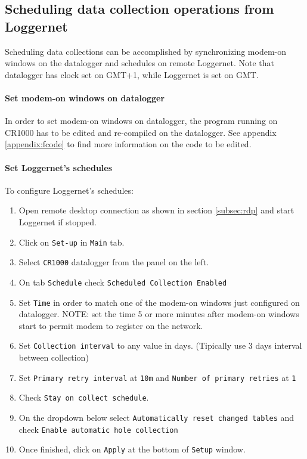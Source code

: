 \subsection{Scheduling data collection operations from Loggernet}
Scheduling data collections can be accomplished by synchronizing modem-on windows on the datalogger
and schedules on remote Loggernet. Note that datalogger has clock set on GMT+1, while Loggernet is set on
GMT.
\paragraph{Set modem-on windows on datalogger}
In order to set modem-on windows on datalogger, the program running on CR1000 has to be edited and re-compiled
on the datalogger. See appendix \ref{appendix:fcode} to find more information on the code to be edited.
\paragraph{Set Loggernet's schedules}
To configure Loggernet's schedules:
\begin{enumerate}
	\item Open remote desktop connection as shown in section \ref{subsec:rdp} and start Loggernet if stopped.
	\item Click on {\tt Set-up} in {\tt Main} tab.
	\item Select {\tt CR1000} datalogger from the panel on the left.
	\item On tab {\tt Schedule} check {\tt Scheduled Collection Enabled}
	\item Set {\tt Time} in order to match one of the modem-on windows just configured on datalogger. NOTE: set the time 5 or more minutes after
		  modem-on windows start to permit modem to register on the network.
	\item Set {\tt Collection interval} to any value in days. (Tipically use 3 days interval between collection)
	\item Set {\tt Primary retry interval} at {\tt 10m} and {\tt Number of primary retries} at {\tt 1}
	\item Check {\tt Stay on collect schedule}.
	\item On the dropdown below select {\tt Automatically reset changed tables} and check {\tt Enable automatic hole collection}
	\item Once finished, click on {\tt Apply} at the bottom of {\tt Setup} window.
\end{enumerate}
